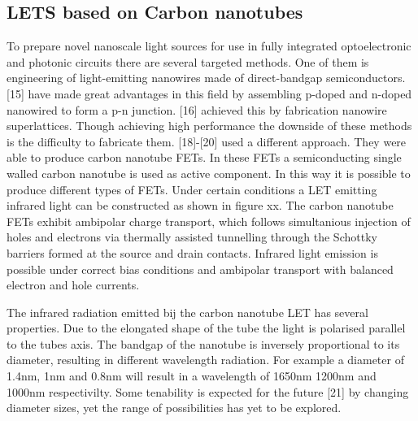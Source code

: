 \subsection{LETS based on Carbon nanotubes} %
To prepare novel nanoscale light sources for use in fully integrated optoelectronic and photonic circuits there are several targeted methods. One of them is engineering of light-emitting nanowires made of direct-bandgap semiconductors. [15] have made great advantages in this field by assembling p-doped and n-doped nanowired to form a p-n junction. [16] achieved this by fabrication nanowire superlattices. Though achieving high performance the downside of these methods is the difficulty to fabricate them. [18]-[20] used a different approach. They were able to produce carbon nanotube FETs. In these FETs a semiconducting single walled carbon nanotube is used as active component. In this way it is possible to produce different types of FETs. 
Under certain conditions a LET emitting infrared light can be constructed as shown in figure xx. The carbon nanotube FETs exhibit ambipolar charge transport, which follows simultanious injection of holes and electrons via thermally assisted tunnelling through the Schottky barriers formed at the source and drain contacts. Infrared light emission is possible under correct bias conditions and ambipolar transport with balanced electron and hole currents.

The infrared radiation emitted bij the carbon nanotube LET has several properties. Due to the elongated shape of the tube the light is polarised parallel to the tubes axis. The bandgap of the nanotube is inversely proportional to its diameter, resulting in different wavelength radiation. For example a diameter of 1.4nm, 1nm and 0.8nm will result in a wavelength of 1650nm 1200nm and 1000nm respectivilty. Some tenability is expected for the future [21] by changing diameter sizes, yet the range of possibilities has yet to be explored.
